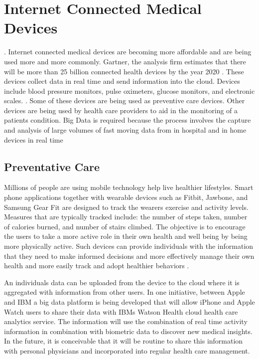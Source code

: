 \documentclass[sigconf]{acmart}
\begin{document}
\section{Internet Connected Medical Devices}. 
Internet connected medical devices are becoming more affordable and are being used more and more commonly.  Gartner, the analysis firm estimates that there will be more than 25 billion connected health devices by the year 2020 \cite{www-google-HlthCat}. These devices collect data in real time and send information into the cloud. Devices include blood pressure monitors, pulse oximeters, glucose monitors, and electronic scales. \cite{www-google-HlthCat}.  Some of these devices are being used as preventive care devices. Other devices are being used by health care providers to aid in the monitoring of a patients condition.  Big Data is required because the process involves the capture and analysis of large volumes of fast moving data from in hospital and in home devices in real time
\subsection{Preventative Care}
Millions of people are using mobile technology help live healthier lifestyles. Smart phone applications together with wearable devices such as Fitbit, Jawbone, and Samsung Gear Fit are designed to track the wearers exercise and activity levels. Measures that are typically tracked include: the number of steps taken, number of calories burned, and number of stairs climbed. The objective is to encourage the users to take a more active role in their own health and well being by being more physically active. Such devices can provide individuals with the information that they need to make informed decisions and more effectively manage their own health and more easily track and adopt healthier behaviors \cite{milbank}. 

An individuals data can be uploaded from the device to the cloud where it is aggregated with information from other users.  In one initiative, between Apple and IBM a big data platform is being developed that will allow iPhone and Apple Watch users to share their data with IBMs Watson Health cloud health care analytics service. The information will use the combination of real time activity information in combination with biometric data to discover new medical insights.  In the future, it is conceivable that it will be routine to share this information with personal physicians and incorporated into regular health care management.
\end{document}
